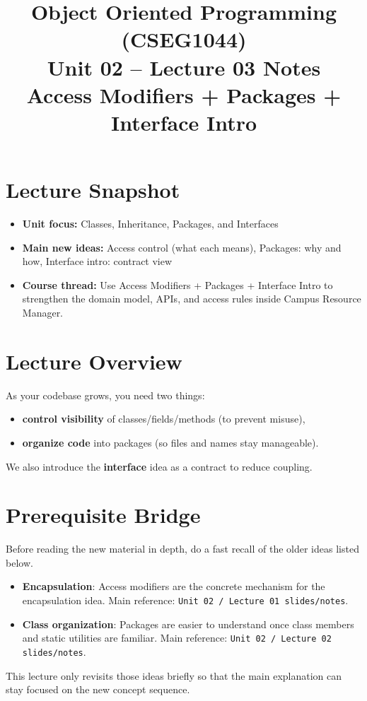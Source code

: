 \documentclass[11pt]{article}
\title{Object Oriented Programming (CSEG1044)\\Unit 02 -- Lecture 03 Notes\\Access Modifiers + Packages + Interface Intro}
\begin{document}
\maketitle
\tableofcontents

\section{Lecture Snapshot}
\begin{itemize}
  \item \textbf{Unit focus:} Classes, Inheritance, Packages, and Interfaces
  \item \textbf{Main new ideas:} Access control (what each means), Packages: why and how, Interface intro: contract view
  \item \textbf{Course thread:} Use Access Modifiers + Packages + Interface Intro to strengthen the domain model, APIs, and access rules inside Campus Resource Manager.
\end{itemize}
\notesources{\OOPSUnitIISources}

\section{Lecture Overview}
As your codebase grows, you need two things:
\begin{itemize}
  \item \textbf{control visibility} of classes/fields/methods (to prevent misuse),
  \item \textbf{organize code} into packages (so files and names stay manageable).
\end{itemize}
We also introduce the \textbf{interface} idea as a contract to reduce coupling.
\notesources{\OOPSUnitIISources}

\section{Prerequisite Bridge}
Before reading the new material in depth, do a fast recall of the older ideas listed below.
\begin{itemize}
  \item \textbf{Encapsulation}: Access modifiers are the concrete mechanism for the encapsulation idea. Main reference: \texttt{Unit 02 / Lecture 01 slides/notes}.
  \item \textbf{Class organization}: Packages are easier to understand once class members and static utilities are familiar. Main reference: \texttt{Unit 02 / Lecture 02 slides/notes}.
\end{itemize}
This lecture only revisits those ideas briefly so that the main explanation can stay focused on the new concept sequence.
\notesources{\OOPSUnitIISources}
\end{document}
